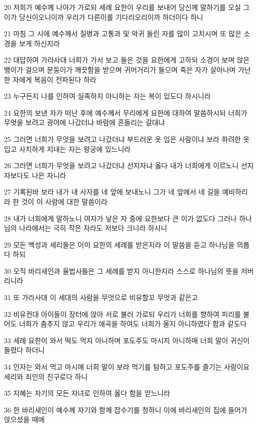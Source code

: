 \par 20 저희가 예수께 나아가 가로되 세례 요한이 우리를 보내어 당신께 말하기를 오실 그이가 당신이오니이까 우리가 다른이를 기다리오리이까 하더이다 하니
\par 21 마침 그 시에 예수께서 질병과 고통과 및 악귀 들린 자를 많이 고치시며 또 많은 소경을 보게 하신지라
\par 22 대답하여 가라사대 너희가 가서 보고 들은 것을 요한에게 고하되 소경이 보며 앉은뱅이가 걸으며 문둥이가 깨끗함을 받으며 귀머거리가 들으며 죽은 자가 살아나며 가난한 자에게 복음이 전파된다 하라
\par 23 누구든지 나를 인하여 실족하지 아니하는 자는 복이 있도다 하시니라
\par 24 요한의 보낸 자가 떠난 후에 예수께서 무리에게 요한에 대하여 말씀하시되 너희가 무엇을 보려고 광야에 나갔더냐 바람에 흔들리는 갈대냐
\par 25 그러면 너희가 무엇을 보려고 나갔더냐 부드러운 옷 입은 사람이냐 보라 화려한 옷 입고 사치하게 지내는 자는 왕궁에 있느니라
\par 26 그러면 너희가 무엇을 보려고 나갔더냐 선지자냐 옳다 내가 너희에게 이르노니 선지자보다도 나은 자니라
\par 27 기록된바 보라 내가 내 사자를 네 앞에 보내노니 그가 네 앞에서 네 길을 예비하리라 한 것이 이 사람에 대한 말씀이라
\par 28 내가 너희에게 말하노니 여자가 낳은 자 중에 요한보다 큰 이가 없도다 그러나 하나님의 나라에서는 극히 작은 자라도 저보다 크니라 하시니
\par 29 모든 백성과 세리들은 이미 요한의 세례를 받은지라 이 말씀을 듣고 하나님을 의롭다 하되
\par 30 오직 바리새인과 율법사들은 그 세례를 받지 아니한지라 스스로 하나님의 뜻을 저버리니라
\par 31 또 가라사대 이 세대의 사람을 무엇으로 비유할꼬 무엇과 같은고
\par 32 비유컨대 아이들이 장터에 앉아 서로 불러 가로되 우리가 너희를 향하여 피리를 불어도 너희가 춤추지 않고 우리가 애곡을 하여도 너희가 울지 아니하였다 함과 같도다
\par 33 세례 요한이 와서 떡도 먹지 아니하며 포도주도 마시지 아니하매 너희 말이 귀신이 들렸다 하더니
\par 34 인자는 와서 먹고 마시매 너희 말이 보라 먹기를 탐하고 포도주를 즐기는 사람이요 세리와 죄인의 친구로다 하니
\par 35 지혜는 자기의 모든 자녀로 인하여 옳다 함을 얻느니라
\par 36 한 바리새인이 예수께 자기와 함께 잡수기를 청하니 이에 바리새인의 집에 들어가 앉으셨을 때에
